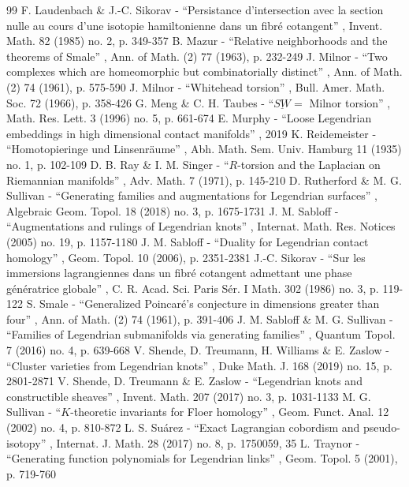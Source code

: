 \documentclass[11pt]{article}
\numberwithin{equation}{section}\providecommand{\dpl}{\displaystyle}
\begin{document}
\begin{thebibliography}{99}
 F. Laudenbach \& J.-C. Sikorav - “Persistance d’intersection avec la section nulle au cours d’une isotopie hamiltonienne dans un fibré cotangent” , Invent. Math. 82 (1985) no. 2, p. 349-357
 B. Mazur - “Relative neighborhoods and the theorems of Smale” , Ann. of Math. (2) 77 (1963), p. 232-249
 J. Milnor - “Two complexes which are homeomorphic but combinatorially distinct” , Ann. of Math. (2) 74 (1961), p. 575-590
 J. Milnor - “Whitehead torsion” , Bull. Amer. Math. Soc. 72 (1966), p. 358-426
 G. Meng \& C. H. Taubes - “$\underline{\mathit{SW}}=$ Milnor torsion” , Math. Res. Lett. 3 (1996) no. 5, p. 661-674
 E. Murphy - “Loose Legendrian embeddings in high dimensional contact manifolds” , 2019
 K. Reidemeister - “Homotopieringe und Linsenräume” , Abh. Math. Sem. Univ. Hamburg 11 (1935) no. 1, p. 102-109
 D. B. Ray \& I. M. Singer - “$R$-torsion and the Laplacian on Riemannian manifolds” , Adv. Math. 7 (1971), p. 145-210
 D. Rutherford \& M. G. Sullivan - “Generating families and augmentations for Legendrian surfaces” , Algebraic Geom. Topol. 18 (2018) no. 3, p. 1675-1731
 J. M. Sabloff - “Augmentations and rulings of Legendrian knots” , Internat. Math. Res. Notices (2005) no. 19, p. 1157-1180
 J. M. Sabloff - “Duality for Legendrian contact homology” , Geom. Topol. 10 (2006), p. 2351-2381
 J.-C. Sikorav - “Sur les immersions lagrangiennes dans un fibré cotangent admettant une phase génératrice globale” , C. R. Acad. Sci. Paris Sér. I Math. 302 (1986) no. 3, p. 119-122
 S. Smale - “Generalized Poincaré’s conjecture in dimensions greater than four” , Ann. of Math. (2) 74 (1961), p. 391-406
 J. M. Sabloff \& M. G. Sullivan - “Families of Legendrian submanifolds via generating families” , Quantum Topol. 7 (2016) no. 4, p. 639-668
 V. Shende, D. Treumann, H. Williams \& E. Zaslow - “Cluster varieties from Legendrian knots” , Duke Math. J. 168 (2019) no. 15, p. 2801-2871
 V. Shende, D. Treumann \& E. Zaslow - “Legendrian knots and constructible sheaves” , Invent. Math. 207 (2017) no. 3, p. 1031-1133
 M. G. Sullivan - “$K$-theoretic invariants for Floer homology” , Geom. Funct. Anal. 12 (2002) no. 4, p. 810-872
 L. S. Suárez - “Exact Lagrangian cobordism and pseudo-isotopy” , Internat. J. Math. 28 (2017) no. 8, p. 1750059, 35
 L. Traynor - “Generating function polynomials for Legendrian links” , Geom. Topol. 5 (2001), p. 719-760

\end{thebibliography}
\end{document}
